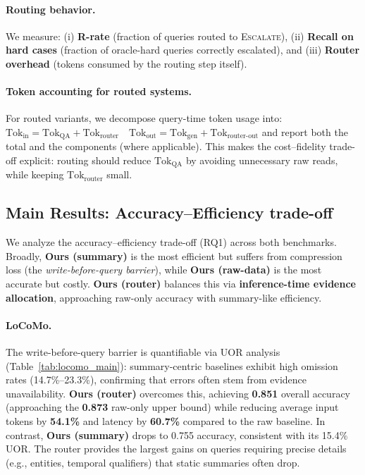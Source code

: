 \documentclass{article}
\theoremstyle{plain}
\theoremstyle{definition}
\theoremstyle{remark}
\begin{document}
\paragraph{Routing behavior.}
We measure:
(i) \textbf{R-rate} (fraction of queries routed to \textsc{Escalate}),
(ii) \textbf{Recall on hard cases} (fraction of oracle-hard queries correctly escalated),
and (iii) \textbf{Router overhead} (tokens consumed by the routing step itself).

\paragraph{Token accounting for routed systems.}
For routed variants, we decompose query-time token usage into:
$
\text{Tok}_{\text{in}} = \text{Tok}_{\text{QA}} + \text{Tok}_{\text{router}}\quad\text{Tok}_{\text{out}} = \text{Tok}_{\text{gen}} + \text{Tok}_{\text{router-out}}$
and report both the total and the components (where applicable).
This makes the cost--fidelity trade-off explicit: routing should reduce $\text{Tok}_{\text{QA}}$ by avoiding unnecessary raw reads, while keeping $\text{Tok}_{\text{router}}$ small.

\subsection{Main Results: Accuracy--Efficiency trade-off}
\label{sec:main_results}

We analyze the accuracy--efficiency trade-off (RQ1) across both benchmarks.
Broadly, \textbf{Ours (summary)} is the most efficient but suffers from compression loss (the \textit{write-before-query barrier}), while \textbf{Ours (raw-data)} is the most accurate but costly.
\textbf{Ours (router)} balances this via \textbf{inference-time evidence allocation}, approaching raw-only accuracy with summary-like efficiency.

\paragraph{LoCoMo.}
The write-before-query barrier is quantifiable via UOR analysis (Table~\ref{tab:locomo_main}): summary-centric baselines exhibit high omission rates (14.7\%--23.3\%), confirming that errors often stem from evidence unavailability.
\textbf{Ours (router)} overcomes this, achieving \textbf{0.851} overall accuracy (approaching the \textbf{0.873} raw-only upper bound) while reducing average input tokens by \textbf{54.1\%} and latency by \textbf{60.7\%} compared to the raw baseline.
In contrast, \textbf{Ours (summary)} drops to 0.755 accuracy, consistent with its 15.4\% UOR.
The router provides the largest gains on queries requiring precise details (e.g., entities, temporal qualifiers) that static summaries often drop.
\end{document}
